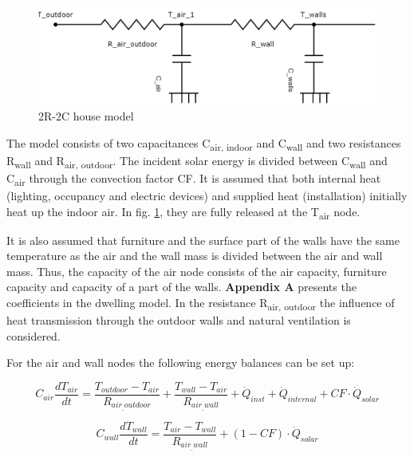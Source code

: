 \begin{figure}[H]
	\centering
	\includegraphics[width=1.0\columnwidth]{Pictures/2R2C_Model.png}
	\caption[Short title]{2R-2C house model}
	\label{fig:elec2R2C}
	\end{figure}
	
The model consists of two capacitances C\textsubscript{air, indoor} and C\textsubscript{wall} and two resistances R\textsubscript{wall} and R\textsubscript{air, outdoor}. The incident solar energy is divided between C\textsubscript{wall} and C\textsubscript{air} through the convection factor CF. It is assumed that both internal heat (lighting, occupancy and electric devices) and supplied heat (installation) initially heat up the indoor air. In fig. \ref{fig:elec2R2C}, they are fully released at the T\textsubscript{air} node. 

 It is also assumed that furniture and the surface part of the walls have the same temperature as the air and the wall mass is divided between the air and wall mass. Thus, the capacity of the air node consists of the air capacity, furniture capacity and capacity of a part of the walls. \textbf{Appendix A} presents the coefficients in the dwelling model. In the resistance R\textsubscript{air, outdoor} the influence of heat transmission through the outdoor walls and natural ventilation is considered. 
 
For the air and wall nodes the following energy balances can be set up: 

\begin{equation}
C_{air}\frac{dT_{air}}{dt}=\frac{T_{outdoor}-T_{air}}{R_{air_{\_}outdoor}} + \frac{T_{wall}-T_{air}}{R_{air_{\_}wall}} + \dot{Q}_{inst} + \dot{Q}_{internal} + CF\cdot\dot{Q}_{solar}
\end{equation}

\begin{equation}
C_{wall}\frac{dT_{wall}}{dt}=\frac{T_{air}-T_{wall}}{R_{air_{\_}wall}} + (1-CF)\cdot\dot{Q}_{solar}
\end{equation}

